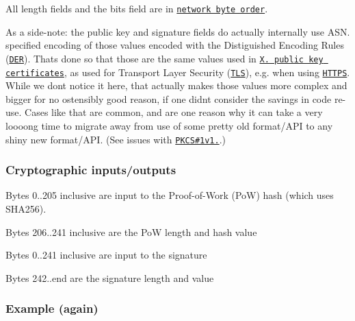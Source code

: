 All length fields and the bits field are in \href{https://en.wikipedia.org/wiki/Network_byte_order}{\tt network byte order}.

As a side-\/note\+: the public key and signature fields do actually internally use A\+S\+N. specified encoding of those values encoded with the Distiguished Encoding Rules (\href{https://en.wikipedia.org/wiki/Distinguished_Encoding_Rules}{\tt D\+ER}). That\textquotesingle{}s done so that those are the same values used in \href{https://tools.ietf.org/html/rfc5280}{\tt X. public key certificates}, as used for Transport Layer Security (\href{https://tools.ietf.org/html/rfc5246}{\tt T\+LS}), e.\+g. when using \href{https://tools.ietf.org/html/rfc2818}{\tt H\+T\+T\+PS}. While we don\textquotesingle{}t notice it here, that actually makes those values more complex and bigger for no ostensibly good reason, if one didn\textquotesingle{}t consider the savings in code re-\/use. Cases like that are common, and are one reason why it can take a very loooong time to migrate away from use of some pretty old format/\+A\+PI to any shiny new format/\+A\+PI. (See issues with \href{https://cryptosense.com/why-pkcs1v1-5-encryption-should-be-put-out-of-our-misery/}{\tt P\+K\+CS\#1v1.}.)

\subsubsection*{Cryptographic inputs/outputs}


\begin{DoxyItemize}
\item Bytes 0..205 inclusive are input to the Proof-\/of-\/\+Work (PoW) hash (which uses S\+H\+A256).
\item Bytes 206..241 inclusive are the PoW length and hash value
\item Bytes 0..241 inclusive are input to the signature
\item Bytes 242..end are the signature length and value
\end{DoxyItemize}

\subsubsection*{Example (again)}


